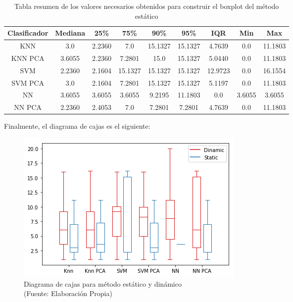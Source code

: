 \begin{table}[!h]
\centering
\caption{Tabla resumen de los valores necesarios obtenidos para construir el boxplot del método estático}
\label{tabla-boxplot-estatico}
\begin{tabular}{|c|c|c|c|c|c|c|c|c|}
\hline
\textbf{Clasificador} & \textbf{Mediana} & \textbf{25\%} & \textbf{75\%} & \textbf{90\%} & \textbf{95\%} & \textbf{IQR} & \textbf{Min} & \textbf{Max} \\ \hline
KNN                   & 3.0              & 2.2360        & 7.0           & 15.1327       & 15.1327       & 4.7639       & 0.0          & 11.1803      \\ \hline
KNN PCA               & 3.6055           & 2.2360        & 7.2801        & 15.0          & 15.1327       & 5.0440       & 0.0          & 11.1803      \\ \hline
SVM                   & 2.2360           & 2.1604        & 15.1327       & 15.1327       & 15.1327       & 12.9723      & 0.0          & 16.1554      \\ \hline
SVM PCA               & 3.0              & 2.1604        & 7.2801        & 15.1327       & 15.1327       & 5.1197      & 0.0          & 11.1803      \\ \hline
NN                    & 3.6055           & 3.6055        & 3.6055        & 9.2195        & 11.1803       & 0.0          & 3.6055       & 3.6055       \\ \hline
NN PCA                & 2.2360           & 2.4053        & 7.0           & 7.2801        & 7.2801        & 4.7639       & 0.0          & 11.1803      \\ \hline
\end{tabular}
\end{table}

Finalmente, el diagrama de cajas es el siguiente:

\begin{figure}[ht!]
\centering
\includegraphics[width=.6\textwidth]{figures/boxplot.png}
\caption[abs]{Diagrama de cajas para método estático y dinámico \\
{\scriptsize (Fuente: Elaboración Propia)}}
\label{fig:boxplot}
\end{figure}

